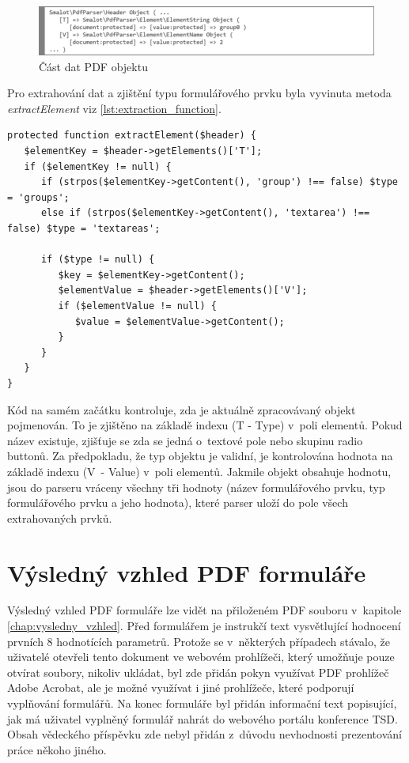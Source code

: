 \begin{figure}[h!]
\centering
\includegraphics[width=15cm]{img/parsing_object}
\caption{Část dat PDF objektu}
\label{fig:parsing_object}
\end{figure}
\par
Pro extrahování dat a zjištění typu formulářového prvku byla vyvinuta metoda \textit{extractElement} viz \ref{lst:extraction_function}.
\begin{lstlisting}[caption = {Funkční kód pro uložení formulářových prvků z~PDF objektů}, label = {lst:extraction_function}, captionpos=b]
protected function extractElement($header) {
   $elementKey = $header->getElements()['T'];                                                      
   if ($elementKey != null) {
      if (strpos($elementKey->getContent(), 'group') !== false) $type = 'groups';
      else if (strpos($elementKey->getContent(), 'textarea') !== false) $type = 'textareas';
                       
      if ($type != null) {
         $key = $elementKey->getContent();
         $elementValue = $header->getElements()['V'];
         if ($elementValue != null) {
            $value = $elementValue->getContent();
         }    
      }
   }
}
\end{lstlisting}
Kód na samém začátku kontroluje, zda je aktuálně zpracovávaný objekt pojmenován. To je zjištěno na základě indexu  (T - Type) v~poli elementů. Pokud název existuje, zjišťuje se zda se jedná o~textové pole nebo skupinu radio buttonů. Za předpokladu, že typ objektu je validní, je kontrolována hodnota na základě indexu  (V~- Value) v~poli elementů. Jakmile objekt obsahuje hodnotu, jsou do parseru vráceny všechny tři hodnoty (název formulářového prvku, typ formulářového prvku a jeho hodnota), které parser uloží do pole všech extrahovaných prvků.

\section{Výsledný vzhled PDF formuláře}
Výsledný vzhled PDF formuláře lze vidět na přiloženém PDF souboru v~kapitole \ref{chap:vysledny_vzhled}. Před formulářem je instrukčí text vysvětlující hodnocení prvních 8 hodnotících parametrů. Protože se v~některých případech stávalo, že uživatelé otevřeli tento dokument ve webovém prohlížeči, který umožňuje pouze otvírat soubory, nikoliv ukládat, byl zde přidán pokyn využívat PDF prohlížeč Adobe Acrobat, ale je možné využívat i jiné prohlížeče, které podporují vyplňování formulářů. Na konec formuláře byl přidán informační text popisující, jak má uživatel vyplněný formulář nahrát do webového portálu konference TSD. Obsah vědeckého příspěvku zde nebyl přidán z~důvodu nevhodnosti prezentování práce někoho jiného.

